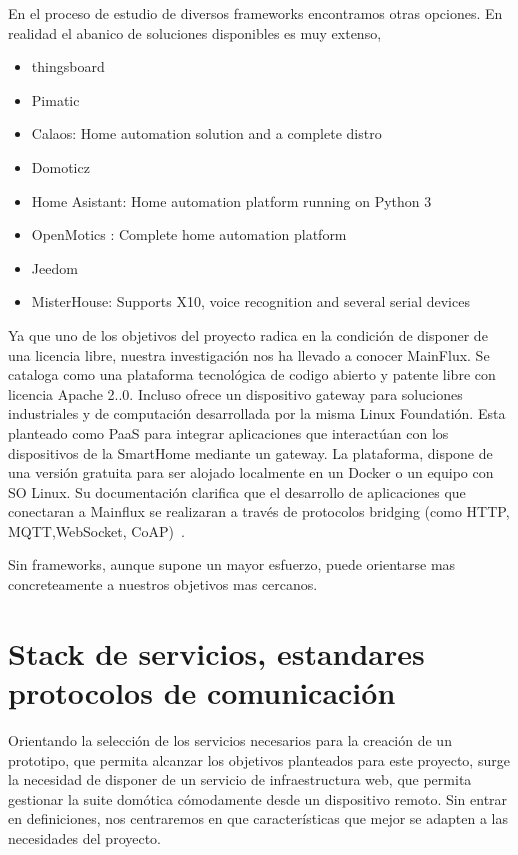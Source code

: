 En el proceso de estudio de diversos frameworks encontramos otras opciones. En realidad el abanico de soluciones disponibles es muy extenso,

\begin{itemize}
\item thingsboard
\item Pimatic
\item Calaos: Home automation solution and a complete distro
\item Domoticz
\item Home Asistant: Home automation platform running on Python 3
\item OpenMotics : Complete home automation platform
\item Jeedom
\item MisterHouse: Supports X10, voice recognition and several serial devices
\end{itemize}

Ya que uno de los objetivos del proyecto radica en la condición de disponer de una licencia libre, nuestra investigación nos ha llevado a conocer MainFlux. Se cataloga como una plataforma tecnológica de codigo abierto y patente libre con licencia Apache 2..0. Incluso ofrece un dispositivo gateway para soluciones industriales y de computación desarrollada por la misma Linux Foundatión. Esta planteado como PaaS para integrar aplicaciones que interactúan con los dispositivos de la SmartHome mediante un gateway. La plataforma, dispone de una versión gratuita para ser alojado localmente en un Docker o un equipo con SO Linux. Su documentación clarifica que el desarrollo de aplicaciones que conectaran a Mainflux se realizaran a través de protocolos bridging (como HTTP, MQTT,WebSocket, CoAP)~\cite{mainfluxdoc}.


Sin frameworks, aunque supone un mayor esfuerzo, puede orientarse mas concreteamente a nuestros objetivos mas cercanos.

\section{Stack de servicios, estandares  protocolos de comunicación}
\label{ch:Capitulo2.3}

Orientando la selección de los servicios necesarios para la creación de un prototipo, que permita alcanzar los objetivos planteados para este proyecto, surge la necesidad de disponer de un servicio de infraestructura web, que permita gestionar la suite domótica cómodamente desde un dispositivo remoto. Sin entrar en definiciones, nos centraremos en que características que mejor se adapten a las necesidades del proyecto.

